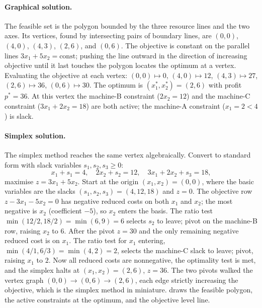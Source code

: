 \paragraph{Graphical solution.}
The feasible set is the polygon bounded by the three resource
lines and the two axes. Its vertices, found by intersecting pairs
of boundary lines, are $(0, 0)$, $(4, 0)$, $(4, 3)$, $(2, 6)$, and
$(0, 6)$. The objective is constant on the parallel lines
$3 x_{1} + 5 x_{2} = \text{const}$; pushing the line outward in
the direction of increasing objective until it last touches the
polygon locates the optimum at a vertex. Evaluating the objective
at each vertex: $(0,0) \mapsto 0$, $(4, 0) \mapsto 12$, $(4, 3)
\mapsto 27$, $(2, 6) \mapsto 36$, $(0, 6) \mapsto 30$. The optimum
is $(x_{1}^{*}, x_{2}^{*}) = (2, 6)$ with profit $p^{*} = 36$. At
this vertex the machine-B constraint ($2 x_{2} = 12$) and the
machine-C constraint ($3 x_{1} + 2 x_{2} = 18$) are both active;
the machine-A constraint ($x_{1} = 2 < 4$) is slack.

\paragraph{Simplex solution.}
The simplex method reaches the same vertex algebraically. Convert
to standard form with slack variables $s_{1}, s_{2}, s_{3} \geq 0$:
\[
x_{1} + s_{1} = 4, \quad 2 x_{2} + s_{2} = 12, \quad
3 x_{1} + 2 x_{2} + s_{3} = 18,
\]
maximise $z = 3 x_{1} + 5 x_{2}$. Start at the origin
$(x_{1}, x_{2}) = (0, 0)$, where the basic variables are the
slacks $(s_{1}, s_{2}, s_{3}) = (4, 12, 18)$ and $z = 0$. The
objective row $z - 3 x_{1} - 5 x_{2} = 0$ has negative reduced
costs on both $x_{1}$ and $x_{2}$; the most negative is $x_{2}$
(coefficient $-5$), so $x_{2}$ enters the basis. The ratio test
$\min(12/2, 18/2) = \min(6, 9) = 6$ selects $s_{2}$ to leave; pivot
on the machine-B row, raising $x_{2}$ to $6$. After the pivot
$z = 30$ and the only remaining negative reduced cost is on $x_{1}$.
The ratio test for $x_{1}$ entering, $\min(4/1, 6/3) = \min(4, 2) =
2$, selects the machine-C slack to leave; pivot, raising $x_{1}$ to
$2$. Now all reduced costs are nonnegative, the optimality test is
met, and the simplex halts at $(x_{1}, x_{2}) = (2, 6)$, $z = 36$.
The two pivots walked the vertex graph $(0,0) \to (0, 6) \to (2,
6)$, each edge strictly increasing the objective, which is the
simplex method in miniature. 
draws the feasible polygon, the active constraints at the optimum,
and the objective level line.

